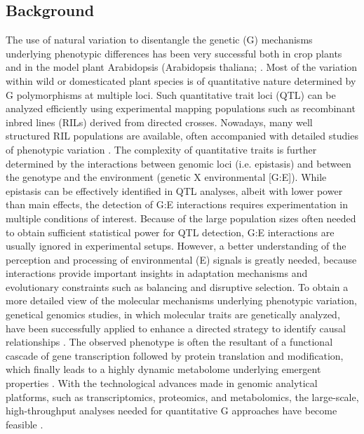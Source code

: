 \subsection{Background}
The use of natural variation to disentangle the genetic (G) mechanisms underlying phenotypic differences 
has been very successful both in crop plants and in the model plant Arabidopsis (Arabidopsis thaliana; 
\cite{Alonso-Blanco:2009}. Most of the variation within wild or domesticated plant species is of 
quantitative nature determined by G polymorphisms at multiple loci. Such quantitative trait loci (QTL) 
can be analyzed efficiently using experimental mapping populations such as recombinant inbred lines (RILs)
derived from directed crosses. Nowadays, many well structured RIL populations are available, often 
accompanied with detailed studies of phenotypic variation \cite{Mitchell-Olds:2006}. The complexity 
of quantitative traits is further determined by the interactions between genomic loci (i.e. epistasis) and 
between the genotype and the environment (genetic X environmental [G:E]). While epistasis can be effectively
identified in QTL analyses, albeit with lower power than main effects, the detection of G:E interactions 
requires experimentation in multiple conditions of interest. Because of the large population sizes often 
needed to obtain sufficient statistical power for QTL detection, G:E interactions are usually ignored in 
experimental setups. However, a better understanding of the perception and processing of environmental (E)
signals is greatly needed, because interactions provide important insights in adaptation mechanisms and
evolutionary constraints such as balancing and disruptive selection. To obtain a more detailed view of the
molecular mechanisms underlying phenotypic variation, genetical genomics studies, in which molecular traits
are genetically analyzed, have been successfully applied to enhance a directed strategy to identify causal
relationships \cite{West:2007, Keurentjes:2007, Kliebenstein:2006, Rowe:2008}. The observed phenotype is often the resultant 
of a functional cascade of gene transcription followed by protein translation and modification, which 
finally leads to a highly dynamic metabolome underlying emergent properties \cite{Kooke:2012}. 
With the technological advances made in genomic analytical platforms, such as transcriptomics, proteomics, 
and metabolomics, the large-scale, high-throughput analyses needed for quantitative G approaches have 
become feasible \cite{Jansen:2001a}. 

